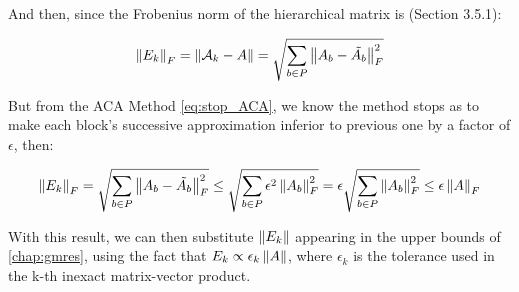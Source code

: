 And then, since the Frobenius norm of the hierarchical matrix is \cite{hackbusch2015hierarchical}(Section 3.5.1):

\begin{equation}
    \left\lVert E_{k}\right\rVert_{F}= \left\lVert\mathcal{A}_{k} - A\right\rVert = \sqrt{\sum_{b \in P} \left\lVert A_{b} - \tilde{A_{b}}\right\rVert_{F}^{2} }
\end{equation}

But from the ACA Method \ref{eq:stop_ACA}, we know the method stops as to make each block's successive approximation inferior to previous one by a factor of $\epsilon$, then:

\begin{equation}
    \left\lVert E_{k}\right\rVert_{F} = \sqrt{\sum_{b \in P} \left\lVert A_{b} - \tilde{A_{b}}\right\rVert_{F}^{2} } \leq \sqrt{\sum_{b\in P}\epsilon^{2}\left\lVert A_{b}\right\rVert_{F}^{2}} = \epsilon \sqrt{\sum_{b \in P}\left\lVert A_{b}\right\rVert_{F}^{2}}
    \leq \epsilon \left\lVert A\right\rVert_{F}
\end{equation}



With this result, we can then substitute $\left\lVert E_{k}\right\rVert$ appearing in the upper bounds of \autoref{chap:gmres}, using the fact that $E_{k}\propto \epsilon_{k} \left\lVert A\right\rVert$, where $\epsilon_{k}$ is the tolerance used in the k-th inexact matrix-vector product.



